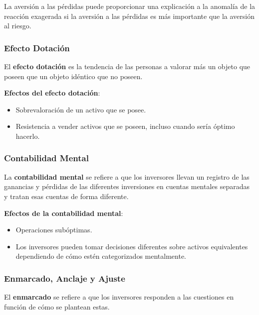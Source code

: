 La aversión a las pérdidas puede proporcionar una explicación a la anomalía de la reacción exagerada si la aversión a las pérdidas es más importante que la aversión al riesgo.

\subsubsection{Efecto Dotación}

\begin{definicion}
El \textbf{efecto dotación} es la tendencia de las personas a valorar más un objeto que poseen que un objeto idéntico que no poseen.
\end{definicion}

\textbf{Efectos del efecto dotación}:
\begin{itemize}
\item Sobrevaloración de un activo que se posee.
\item Resistencia a vender activos que se poseen, incluso cuando sería óptimo hacerlo.
\end{itemize}

\subsubsection{Contabilidad Mental}

\begin{definicion}
La \textbf{contabilidad mental} se refiere a que los inversores llevan un registro de las ganancias y pérdidas de las diferentes inversiones en cuentas mentales separadas y tratan esas cuentas de forma diferente.
\end{definicion}

\textbf{Efectos de la contabilidad mental}:
\begin{itemize}
\item Operaciones subóptimas.
\item Los inversores pueden tomar decisiones diferentes sobre activos equivalentes dependiendo de cómo estén categorizados mentalmente.
\end{itemize}

\subsubsection{Enmarcado, Anclaje y Ajuste}

\begin{definicion}[Enmarcado]
El \textbf{enmarcado} se refiere a que los inversores responden a las cuestiones en función de cómo se plantean estas.
\end{definicion}

